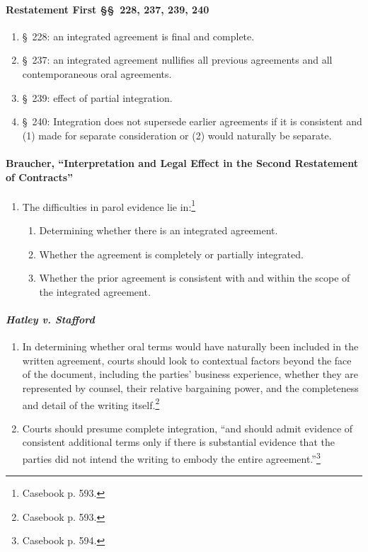 \paragraph{Restatement First \S\S\ 228, 237, 239, 240}

\begin{enumerate}
    \item \S\ 228: an integrated agreement is final and complete.
    \item \S\ 237: an integrated agreement nullifies all previous agreements 
    and all contemporaneous oral agreements.
    \item \S\ 239: effect of partial integration. %
    \item \S\ 240: Integration does not supersede earlier agreements if it is 
    consistent and (1) made for separate consideration or (2) would naturally 
    be separate.
\end{enumerate}

\paragraph{Braucher, ``Interpretation and Legal Effect in the Second 
Restatement of Contracts''}

\begin{enumerate}
    \item The difficulties in parol evidence lie in:\footnote{Casebook p. 
    593.}
    \begin{enumerate}
        \item Determining whether there is an integrated agreement.
        \item Whether the agreement is completely or partially integrated.
        \item Whether the prior agreement is consistent with and within the 
        scope of the integrated agreement.
    \end{enumerate}
\end{enumerate}

\paragraph{\emph{Hatley v. Stafford}}

\begin{enumerate}
    \item In determining whether oral terms would have naturally been included 
    in the written agreement, courts should look to contextual factors beyond 
    the face of the document, including the parties' business experience, 
    whether they are represented by counsel, their relative bargaining power, 
    and the completeness and detail of the writing itself.\footnote{Casebook 
    p. 593.}
    \item Courts should presume complete integration, ``and should admit 
    evidence of consistent additional terms only if there is substantial 
    evidence that the parties did not intend the writing to embody the entire 
    agreement.''\footnote{Casebook p. 594.}
\end{enumerate}

